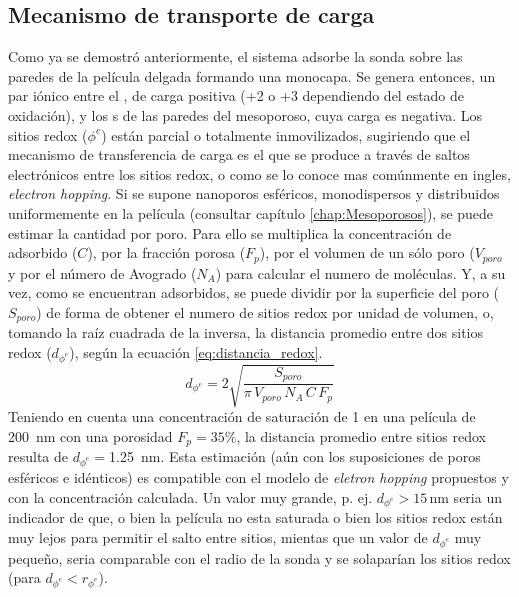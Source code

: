 	\subsection{Mecanismo de transporte de carga}

	 Como ya se demostró anteriormente, el sistema adsorbe la sonda sobre las paredes de la película delgada formando una monocapa. Se genera entonces, un par iónico entre el \ru, de carga positiva (+2 o +3 dependiendo del estado de oxidación), y los s de las paredes del mesoporoso, cuya carga es negativa. Los sitios redox ($\phi^{e}$) están parcial o totalmente inmovilizados, sugiriendo que el mecanismo de transferencia de carga es el que se produce a través de saltos electrónicos entre los sitios redox, o como se lo conoce mas comúnmente en ingles, \textit{electron hopping}. %
	 Si se supone nanoporos esféricos, monodispersos y distribuidos uniformemente en la película (consultar capítulo \ref{chap:Mesoporosos}), se puede estimar la cantidad \ru\space por poro. Para ello se multiplica la concentración de \ru\space adsorbido ($C$), por la fracción porosa ($F_p$), por el volumen de un sólo poro ($V_{poro}$ y por el número de Avogrado ($N_{A}$) para calcular el numero de moléculas. Y, a su vez, como se encuentran adsorbidos, se puede dividir por la superficie del poro ($S_{poro}$) de forma de obtener el numero de sitios redox por unidad de volumen, o, tomando la raíz cuadrada de la inversa, la distancia promedio entre dos sitios redox ($d_{\phi^{e}}$), según la ecuación \ref{eq:distancia_redox}. 
	 	\begin{equation}
					d_{\phi^{e}}=2\sqrt{\frac{S_{poro}}{\pi\, V_{poro}\, N_A\, C\, F_p}}
					\label{eq:distancia_redox}
			\end{equation}
	 Teniendo en cuenta una concentración de saturación de \SI{1}{\Molar} en una película de \SI{200}{nm} con una porosidad $F_p=35\%$, la distancia promedio entre sitios redox resulta de $d_{\phi^{e}}=$\SI{1.25}{nm}. Esta estimación (aún con los suposiciones de poros esféricos e idénticos) es compatible con el modelo de \textit{eletron hopping} propuestos y con la concentración calculada. Un valor muy grande, p. ej. $d_{\phi^{e}}>15\, \text{nm}$ seria un indicador de que, o bien la película no esta saturada o bien los sitios redox están muy lejos para permitir el salto entre sitios, mientas que un valor de $d_{\phi^{e}}$ muy pequeño, seria comparable con el radio de la sonda y se solaparían los sitios redox (para $d_{\phi^{e}} < r_{\phi^{e}}$). 
